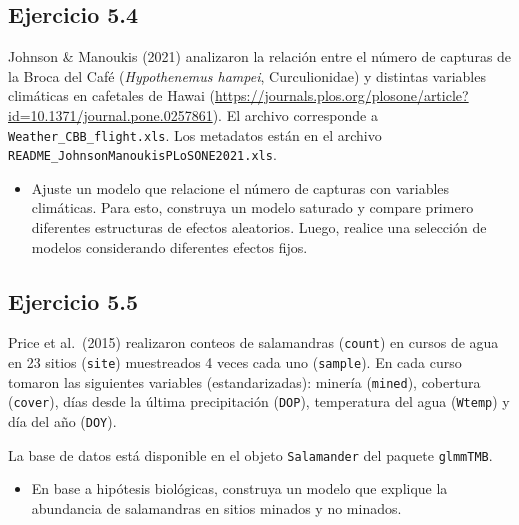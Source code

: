 \documentclass[
]{book}
\providecommand{\tightlist}{%
  \setlength{\itemsep}{0pt}\setlength{\parskip}{0pt}}
\begin{document}
\hypertarget{ejercicio-5.4}{%
\subsection{Ejercicio 5.4}\label{ejercicio-5.4}}

Johnson \& Manoukis (2021) analizaron la relación entre el número de capturas de la Broca del Café (\emph{Hypothenemus hampei}, Curculionidae) y distintas variables climáticas en cafetales de Hawai (\url{https://journals.plos.org/plosone/article?id=10.1371/journal.pone.0257861}). El archivo corresponde a \texttt{Weather\_CBB\_flight.xls}. Los metadatos están en el archivo \texttt{README\_JohnsonManoukisPLoSONE2021.xls}.

\begin{itemize}
\tightlist
\item
  Ajuste un modelo que relacione el número de capturas con variables climáticas. Para esto, construya un modelo saturado y compare primero diferentes estructuras de efectos aleatorios. Luego, realice una selección de modelos considerando diferentes efectos fijos.
\end{itemize}

\hypertarget{ejercicio-5.5}{%
\subsection{Ejercicio 5.5}\label{ejercicio-5.5}}

Price et al.~(2015) realizaron conteos de salamandras (\texttt{count}) en cursos de agua en 23 sitios (\texttt{site}) muestreados 4 veces cada uno (\texttt{sample}). En cada curso tomaron las siguientes variables (estandarizadas): minería (\texttt{mined}), cobertura (\texttt{cover}), días desde la última precipitación (\texttt{DOP}), temperatura del agua (\texttt{Wtemp}) y día del año (\texttt{DOY}).

La base de datos está disponible en el objeto \texttt{Salamander} del paquete \texttt{glmmTMB}.

\begin{itemize}
\tightlist
\item
  En base a hipótesis biológicas, construya un modelo que explique la abundancia de salamandras en sitios minados y no minados.
\end{itemize}
\end{document}
